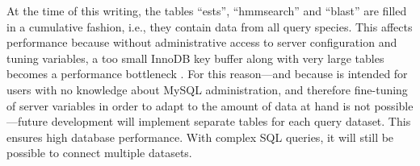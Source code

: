 At the time of this writing, the tables ``ests'', ``hmmsearch'' and ``blast''
are filled in a cumulative fashion, i.e., they contain data from all query
species. This affects performance because without administrative access to
server configuration and tuning variables, a too small InnoDB key buffer along
with very large tables becomes a performance bottleneck \citep{mysql2013}. For
this reason---and because \pname is intended for users with no knowledge about
MySQL administration, and therefore fine-tuning of server variables in order to
adapt to the amount of data at hand is not possible---future development will
implement separate tables for each query dataset. This ensures high database
performance. With complex SQL queries, it will still be possible to connect
multiple datasets.

